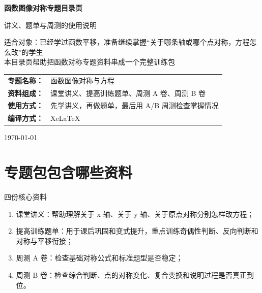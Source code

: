 \documentclass[11pt,a4paper,fontset=fandol]{ctexart}
\begin{document}
\thispagestyle{empty}
\begin{titlepage}
\centering
\vspace*{0.9cm}

\begin{tcolorbox}[
  enhanced,
  width=0.92\textwidth,
  colback=white,
  colframe=mainblue,
  boxrule=1pt,
  arc=0mm,
  left=6mm,
  right=6mm,
  top=8mm,
  bottom=8mm
]
\centering

{\fontsize{24}{30}\selectfont\bfseries 函数图像对称专题目录页\par}
\vspace{0.65cm}
{\fontsize{17}{22}\selectfont 讲义、题单与周测的使用说明\par}

\vspace{1cm}
\begin{tcolorbox}[colback=lightblue,colframe=mainblue,width=0.84\textwidth,boxrule=1pt]
\centering
{\large 适合对象：已经学过函数平移，准备继续掌握“关于哪条轴或哪个点对称，方程怎么改”的学生}\\[0.35em]
{\normalsize 本目录页帮助把函数对称专题资料串成一个完整训练包}
\end{tcolorbox}

\vspace{1.0cm}
\renewcommand{\arraystretch}{1.42}
\begin{tabular}{>{\bfseries}p{3.5cm}p{8cm}}
专题名称： & 函数图像对称与方程 \\
资料组成： & 课堂讲义、提高训练题单、周测 A 卷、周测 B 卷 \\
使用方式： & 先学讲义，再做题单，最后用 A/B 周测检查掌握情况 \\
编译方式： & XeLaTeX \\
\end{tabular}

\vspace{0.9cm}
{\large \today\par}
\end{tcolorbox}
\end{titlepage}

\tableofcontents
\newpage

\section{专题包包含哪些资料}

\begin{goalbox}{四份核心资料}
\begin{enumerate}
  \item 课堂讲义：帮助理解关于 x 轴、关于 y 轴、关于原点对称分别怎样改方程；
  \item 提高训练题单：用于课后巩固和变式提升，重点训练奇偶性判断、反向判断和对称与平移衔接；
  \item 周测 A 卷：检查基础对称公式和标准题型是否稳定；
  \item 周测 B 卷：检查综合判断、点的对称变化、复合变换和说明过程是否真正到位。
\end{enumerate}
\end{goalbox}
\end{document}
